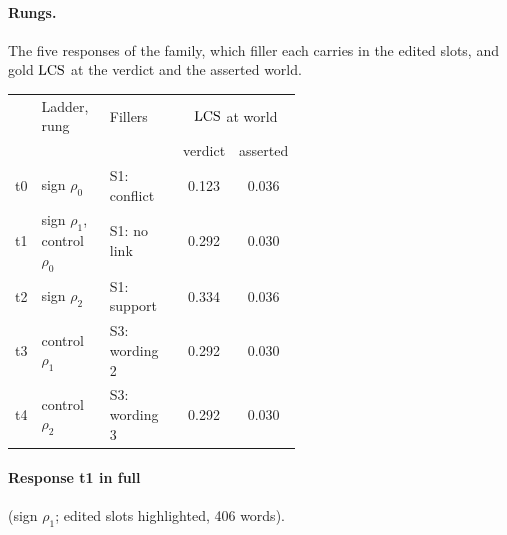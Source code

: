 \paragraph{Rungs.} The five responses of the family, which filler each carries in the edited slots, and gold $\mathrm{LCS}$ at the verdict and the asserted world.

\begin{center}\scriptsize
\setlength{\tabcolsep}{2.5pt}
\begin{tabular}{@{}l>{\raggedright\arraybackslash}p{0.27\linewidth}>{\raggedright\arraybackslash}p{0.30\linewidth}cc@{}}
\toprule
& Ladder, rung & Fillers & \multicolumn{2}{c}{$\mathrm{LCS}$ at world} \\
& & & verdict & asserted \\
\midrule
t0 & sign $\rho_0$ & S1: conflict & 0.123 & 0.036 \\
t1 & sign $\rho_1$, control $\rho_0$ & S1: no link & 0.292 & 0.030 \\
t2 & sign $\rho_2$ & S1: support & 0.334 & 0.036 \\
t3 & control $\rho_1$ & S3: wording 2 & 0.292 & 0.030 \\
t4 & control $\rho_2$ & S3: wording 3 & 0.292 & 0.030 \\
\bottomrule
\end{tabular}
\end{center}

\paragraph{Response t1 in full} (sign $\rho_1$; edited slots highlighted, 406 words).

